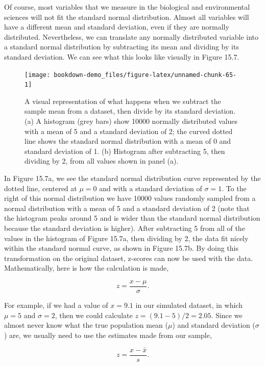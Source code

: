 \documentclass[
]{scrbook}
\begin{document}
Of course, most variables that we measure in the biological and environmental sciences will not fit the standard normal distribution.
Almost all variables will have a different mean and standard deviation, even if they are normally distributed.
Nevertheless, we can translate any normally distributed variable into a standard normal distribution by subtracting its mean and dividing by its standard deviation.
We can see what this looks like visually in Figure 15.7.

\begin{figure}
\texttt{[image: bookdown-demo\_files/figure-latex/unnamed-chunk-65-1]} \caption{A visual representation of what happens when we subtract the sample mean from a dataset, then divide by its standard deviation. (a) A histogram (grey bars) show 10000 normally distributed values with a mean of 5 and a standard deviation of 2; the curved dotted line shows the standard normal distribution with a mean of 0 and standard deviation of 1. (b) Histogram after subtracting 5, then dividing by 2, from all values shown in panel (a).}\label{fig:unnamed-chunk-65}
\end{figure}

In Figure 15.7a, we see the standard normal distribution curve represented by the dotted line, centered at \(\mu = 0\) and with a standard deviation of \(\sigma = 1\).
To the right of this normal distribution we have 10000 values randomly sampled from a normal distribution with a mean of 5 and a standard deviation of 2 (note that the histogram peaks around 5 and is wider than the standard normal distribution because the standard deviation is higher).
After subtracting 5 from all of the values in the histogram of Figure 15.7a, then dividing by 2, the data fit nicely within the standard normal curve, as shown in Figure 15.7b.
By doing this transformation on the original dataset, z-scores can now be used with the data.
Mathematically, here is how the calculation is made,

\[z = \frac{x - \mu}{\sigma}.\]

For example, if we had a value of \(x = 9.1\) in our simulated dataset, in which \(\mu = 5\) and \(\sigma = 2\), then we could calculate \(z = (9.1 - 5) / 2 = 2.05\).
Since we almost never know what the true population mean (\(\mu\)) and standard deviation (\(\sigma\)) are, we usually need to use the estimates made from our sample,

\[z = \frac{x - \bar{x}}{s}.\]
\end{document}
